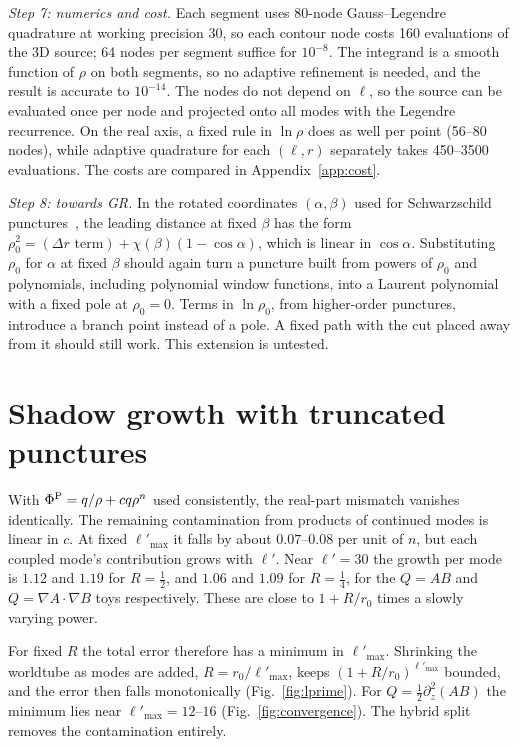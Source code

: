 \documentclass[aps,prl,twocolumn,superscriptaddress,nofootinbib,floatfix]{revtex4-2}
\newcommand{\PhiP}{\Phi^{\rm P}}
\begin{document}
\emph{Step 7: numerics and cost.}
Each segment uses 80-node Gauss--Legendre quadrature at working precision 30, so each contour node costs 160 evaluations of the 3D source; 64 nodes per segment suffice for $10^{-8}$.
The integrand is a smooth function of $\rho$ on both segments, so no adaptive refinement is needed, and the result is accurate to $10^{-14}$.
The nodes do not depend on $\ell$, so the source can be evaluated once per node and projected onto all modes with the Legendre recurrence.
On the real axis, a fixed rule in $\ln\rho$ does as well per point (56--80 nodes), while adaptive quadrature for each $(\ell,r)$ separately takes 450--3500 evaluations.
The costs are compared in Appendix~\ref{app:cost}.

\emph{Step 8: towards GR.}
In the rotated coordinates $(\alpha,\beta)$ used for Schwarzschild punctures~\cite{Upton2026}, the leading distance at fixed $\beta$ has the form $\rho_0^2=(\Delta r\text{ term})+\chi(\beta)(1-\cos\alpha)$, which is linear in $\cos\alpha$.
Substituting $\rho_0$ for $\alpha$ at fixed $\beta$ should again turn a puncture built from powers of $\rho_0$ and polynomials, including polynomial window functions, into a Laurent polynomial with a fixed pole at $\rho_0=0$.
Terms in $\ln\rho_0$, from higher-order punctures, introduce a branch point instead of a pole. A fixed path with the cut placed away from it should still work.
This extension is untested.

\section{Shadow growth with truncated punctures}\label{app:shadow}
With $\PhiP=q/\rho+cq\rho^n$ used consistently, the real-part mismatch vanishes identically.
The remaining contamination from products of continued modes is linear in $c$.
At fixed $\ell'_{\max}$ it falls by about $0.07$--$0.08$ per unit of $n$, but each coupled mode's contribution grows with $\ell'$.
Near $\ell'=30$ the growth per mode is $1.12$ and $1.19$ for $R=\tfrac12$, and $1.06$ and $1.09$ for $R=\tfrac14$, for the $Q=AB$ and $Q=\nabla A\cdot\nabla B$ toys respectively.
These are close to $1+R/r_0$ times a slowly varying power.

For fixed $R$ the total error therefore has a minimum in $\ell'_{\max}$.
Shrinking the worldtube as modes are added, $R=r_0/\ell'_{\max}$, keeps $(1+R/r_0)^{\ell'_{\max}}$ bounded, and the error then falls monotonically (Fig.~\ref{fig:lprime}).
For $Q=\tfrac12\partial_z^2(AB)$ the minimum lies near $\ell'_{\max}=12$--$16$ (Fig.~\ref{fig:convergence}).
The hybrid split removes the contamination entirely.
\end{document}
